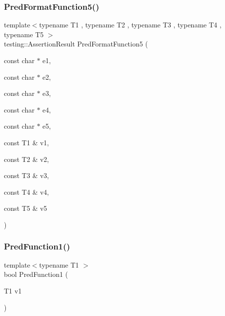 \mbox{\label{_obj__test_2lib_2googletest-release-1_88_81_2googletest_2test_2gtest__pred__impl__unittest_8cc_a09cbd3b6651151c3b97a890d28bdb75f}} 
\subsubsection{\texorpdfstring{PredFormatFunction5()}{PredFormatFunction5()}}
{\footnotesize\ttfamily template$<$typename T1 , typename T2 , typename T3 , typename T4 , typename T5 $>$ \\
testing\+::\+Assertion\+Result Pred\+Format\+Function5 (\begin{DoxyParamCaption}\item[{const char $\ast$}]{e1,  }\item[{const char $\ast$}]{e2,  }\item[{const char $\ast$}]{e3,  }\item[{const char $\ast$}]{e4,  }\item[{const char $\ast$}]{e5,  }\item[{const T1 \&}]{v1,  }\item[{const T2 \&}]{v2,  }\item[{const T3 \&}]{v3,  }\item[{const T4 \&}]{v4,  }\item[{const T5 \&}]{v5 }\end{DoxyParamCaption})}

\mbox{\label{_obj__test_2lib_2googletest-release-1_88_81_2googletest_2test_2gtest__pred__impl__unittest_8cc_aa8827b7fab495de26f406affdf47a697}} 
\subsubsection{\texorpdfstring{PredFunction1()}{PredFunction1()}}
{\footnotesize\ttfamily template$<$typename T1 $>$ \\
bool Pred\+Function1 (\begin{DoxyParamCaption}\item[{T1}]{v1 }\end{DoxyParamCaption})}

